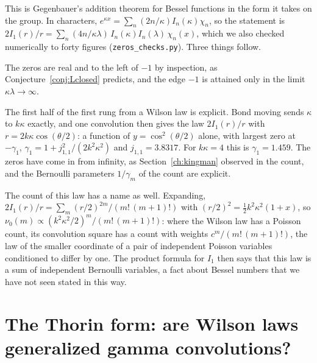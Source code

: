 This is Gegenbauer's addition theorem for Bessel functions in the form it takes on the group. In characters, $e^{\kappa x}=\sum_n(2n/\kappa)I_n(\kappa)\chi_n$, so the statement is $2I_1(r)/r=\sum_n(4n/\kappa\lambda)\,I_n(\kappa)I_n(\lambda)\,\chi_n(x)$, which we also checked numerically to forty figures (\texttt{zeros\_checks.py}). Three things follow.

The zeros are real and to the left of $-1$ by inspection, as Conjecture~\ref{conj:Lclosed} predicts, and the edge $-1$ is attained only in the limit $\kappa\lambda\to\infty$.

The first half of the first rung from a Wilson law is explicit. Bond moving sends $\kappa$ to $k\kappa$ exactly, and one convolution then gives the law $2I_1(r)/r$ with $r=2k\kappa\cos(\theta/2)$: a function of $y=\cos^2(\theta/2)$ alone, with largest zero at $-\gamma_1$, $\gamma_1=1+j_{1,1}^2/(2k^2\kappa^2)$ and $j_{1,1}=3.8317$. For $k\kappa=4$ this is $\gamma_1=1.459$. The zeros have come in from infinity, as Section~\ref{ch:kingman} observed in the count, and the Bernoulli parameters $1/\gamma_m$ of the count are explicit.

The count of this law has a name as well. Expanding, $2I_1(r)/r=\sum_m(r/2)^{2m}/(m!\,(m+1)!)$ with $(r/2)^2=\frac12k^2\kappa^2(1+x)$, so $\nu_0(m)\propto(k^2\kappa^2/2)^m/(m!\,(m+1)!)$: where the Wilson law has a Poisson count, its convolution square has a count with weights $c^m/(m!\,(m+1)!)$, the law of the smaller coordinate of a pair of independent Poisson variables conditioned to differ by one. The product formula for $I_1$ then says that this law is a sum of independent Bernoulli variables, a fact about Bessel numbers that we have not seen stated in this way.

\section{The Thorin form: are Wilson laws generalized gamma convolutions?}


